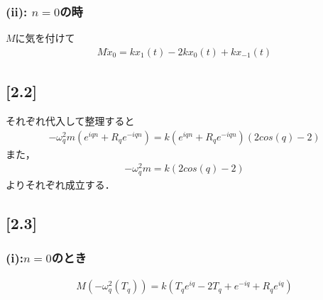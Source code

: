 \documentclass[12pt,dvipdfmx]{jsarticle}
\begin{document}
\subsubsection*{(ii): $n=0$の時}
$M$に気を付けて
\begin{eqnarray}
  M\ddot{x}_0 = k x_{1}(t)- 2k x_0(t) + k x_{-1}(t)
\end{eqnarray}
\subsection*{\large{[2.2]}}
それぞれ代入して整理すると
\begin{eqnarray}
  -\omega_q^2m \left( e^{iqn}+ R_q e^{-iqn} \right) =k\left( e^{iqn}+ R_q e^{-iqn} \right) \left( 2cos(q)-2 \right)
\end{eqnarray}
また，
\begin{eqnarray}
  -\omega_q^2m = k\left( 2cos(q)-2 \right)
\end{eqnarray}
よりそれぞれ成立する．
\subsection*{\large{[2.3]}}
\subsubsection*{(i):$n=0$のとき}
\begin{eqnarray}
  M\left( -\omega_q^2\left( T_q \right) \right) = k\left( T_q e^{iq}-2T_q+e^{-iq} + R_q e^{iq} \right) 
\end{eqnarray}
\end{document}
